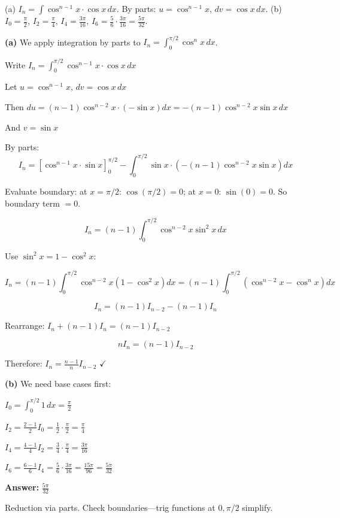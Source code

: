 \begin{hint}
(a) $I_n = \int \cos^{n-1}x \cdot \cos x \, dx$. By parts: $u = \cos^{n-1}x$, $dv = \cos x \, dx$. (b) $I_0 = \frac{\pi}{2}$, $I_2 = \frac{\pi}{4}$, $I_4 = \frac{3\pi}{16}$, $I_6 = \frac{5}{6} \cdot \frac{3\pi}{16} = \frac{5\pi}{32}$.
\end{hint}

\begin{solution}
\textbf{(a)} We apply integration by parts to $I_n = \int_0^{\pi/2}\cos^n x\,dx$.

Write $I_n = \int_0^{\pi/2}\cos^{n-1}x \cdot \cos x\,dx$

Let $u=\cos^{n-1}x$, $dv=\cos x\,dx$

Then $du = (n-1)\cos^{n-2}x \cdot (-\sin x)dx = -(n-1)\cos^{n-2}x\sin x\,dx$

And $v = \sin x$

By parts:
\[
I_n = [\cos^{n-1}x \cdot \sin x]_0^{\pi/2} - \int_0^{\pi/2}\sin x \cdot (-(n-1)\cos^{n-2}x\sin x)dx
\]

Evaluate boundary: at $x=\pi/2$: $\cos(\pi/2)=0$; at $x=0$: $\sin(0)=0$. So boundary term $= 0$.

\[
I_n = (n-1)\int_0^{\pi/2}\cos^{n-2}x\sin^2 x\,dx
\]

Use $\sin^2 x = 1 - \cos^2 x$:

\[
I_n = (n-1)\int_0^{\pi/2}\cos^{n-2}x(1-\cos^2 x)dx = (n-1)\int_0^{\pi/2}(\cos^{n-2}x - \cos^n x)dx
\]

\[
I_n = (n-1)I_{n-2} - (n-1)I_n
\]

Rearrange: $I_n + (n-1)I_n = (n-1)I_{n-2}$

\[
nI_n = (n-1)I_{n-2}
\]

Therefore: $\boxed{I_n = \frac{n-1}{n}I_{n-2}}$ $\checkmark$

\textbf{(b)} We need base cases first:

$I_0 = \int_0^{\pi/2}1\,dx = \frac{\pi}{2}$

$I_2 = \frac{2-1}{2}I_0 = \frac{1}{2} \cdot \frac{\pi}{2} = \frac{\pi}{4}$

$I_4 = \frac{4-1}{4}I_2 = \frac{3}{4} \cdot \frac{\pi}{4} = \frac{3\pi}{16}$

$I_6 = \frac{6-1}{6}I_4 = \frac{5}{6} \cdot \frac{3\pi}{16} = \frac{15\pi}{96} = \frac{5\pi}{32}$

\textbf{Answer:} $\boxed{\frac{5\pi}{32}}$
\end{solution}

\begin{takeaways}
Reduction via parts. Check boundaries—trig functions at $0, \pi/2$ simplify.
\end{takeaways}

